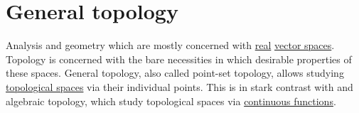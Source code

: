 \section{General topology}\label{sec:general_topology}

Analysis and geometry which are mostly concerned with \hyperref[def:real_numbers]{real} \hyperref[def:vector_space]{vector spaces}. Topology is concerned with the bare necessities in which desirable properties of these spaces. General topology, also called point-set topology, allows studying \hyperref[def:topological_space]{topological spaces} via their individual points. This is in stark contrast with  and algebraic topology, which study topological spaces via \hyperref[def:global_continuity]{continuous functions}.

